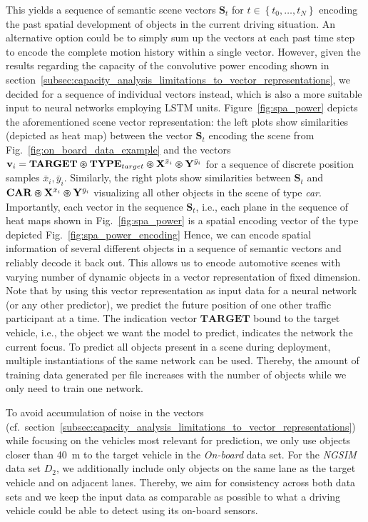 This yields a sequence of semantic scene vectors $\mathbf{S}_{t}$ for $t \in \left\{t_{0}, \ldots, t_{N} \right\}$ encoding the past spatial development of objects in the current driving situation.
An alternative option could be to simply sum up the vectors at each past time step to encode the complete motion history within a single vector.
However, given the results regarding the capacity of the convolutive power encoding shown in section~\ref{subsec:capacity_analysis_limitations_to_vector_representations}, we decided for a sequence of individual vectors instead, which is also a more suitable input to neural networks employing \ac{LSTM} units.
Figure~\ref{fig:spa_power} depicts the aforementioned scene vector representation: the left plots show similarities (depicted as heat map) between the vector $\mathbf{S}_{t}$ encoding the scene from Fig.~\ref{fig:on_board_data_example} and the vectors $ \mathbf{v}_{i}=\mathbf{TARGET}\varoast \mathbf{TYPE}_{target} \varoast \mathbf{X}^{\bar{x}_{i}} \varoast \mathbf{Y}^{\bar{y}_{i}}$ for a sequence of discrete position samples ${\bar{x}_{i}, \bar{y}_{i}}$.
Similarly, the right plots show similarities between $\mathbf{S}_{t}$ and $\mathbf{CAR} \varoast \mathbf{X}^{\bar{x}_{i}} \varoast \mathbf{Y}^{\bar{y}_{i}}$ visualizing all other objects in the scene of type \emph{car}.
Importantly, each vector in the sequence $ \mathbf{S}_{t}$, i.e., each plane in the sequence of heat maps shown in Fig.~\ref{fig:spa_power} is a spatial encoding vector of the type depicted Fig.~\ref{fig:spa_power_encoding}
Hence, we can encode spatial information of several different objects in a sequence of semantic vectors and reliably decode it back out.
This allows us to encode automotive scenes with varying number of dynamic objects in a vector representation of fixed dimension.
Note that by using this vector representation as input data for a neural network (or any other predictor), we predict the future position of one other traffic participant at a time.
The indication vector $\mathbf{TARGET}$ bound to the target vehicle, i.e., the object we want the model to predict, indicates the network the current focus.
To predict all objects present in a scene during deployment, multiple instantiations of the same network can be used.
Thereby, the amount of training data generated per file increases with the number of objects while we only need to train one network.

To avoid accumulation of noise in the vectors (cf.\ section~\ref{subsec:capacity_analysis_limitations_to_vector_representations}) while focusing on the vehicles most relevant for prediction, we only use objects closer than \SI{40}{\meter} to the target vehicle in the \emph{On-board} data set.
For the \emph{\ac{NGSIM}} data set $D_2$, we additionally include only objects on the same lane as the target vehicle and on adjacent lanes.
Thereby, we aim for consistency across both data sets and we keep the input data as comparable as possible to what a driving vehicle could be able to detect using its on-board sensors.

